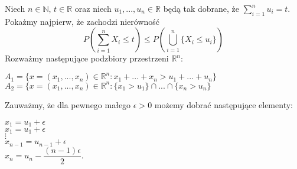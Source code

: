 \documentclass[12pt,a4paper,openany]{book}
\begin{document}
\noindent Niech $n \in \mathbb{N}$, $t \in \mathbb{R}$ oraz niech $u_{1},...,u_{n} \in \mathbb{R}$ będą tak dobrane, że $\sum\limits_{i=1}^{n} u_{i} = t$.\\
\noindent Pokażmy najpierw, że zachodzi nierówność
\begin{equation}
P\left(\sum\limits_{i=1}^{n} X_{i} \leqslant t\right) \leqslant P\left( \bigcup\limits_{i=1}^{n} \lbrace X_{i} \leqslant u_{i} \rbrace \right) \tag{$\star$}
\end{equation}
\noindent Rozważmy następujące podzbiory przestrzeni $\mathbb{R}^n$:
\begin{center}
$A_{1} = \lbrace x = (x_{1},...,x_{n}) \in \mathbb{R}^n : x_{1} + ... + x_{n} > u_{1} + ... + u_{n} \rbrace$ \\
$A_{2} = \lbrace x = (x_{1},...,x_{n}) \in \mathbb{R}^n : \lbrace x_{1} > u_{1} \rbrace \cap  ... \cap \lbrace x_{n} > u_{n} \rbrace$
\end{center}
\noindent Zauważmy, że dla pewnego małego $\epsilon > 0$ możemy dobrać następujące elementy:
\begin{centering}
$x_{1} = u_{1} + \epsilon$\\
$x_{1} = u_{1} + \epsilon$\\
$\vdots$\\
$x_{n-1} = u_{n-1} + \epsilon$ \\
\medskip
$x_{n} = u_{n} - \dfrac{(n-1)\epsilon}{2}.$\\
\end{centering}
\end{document}
